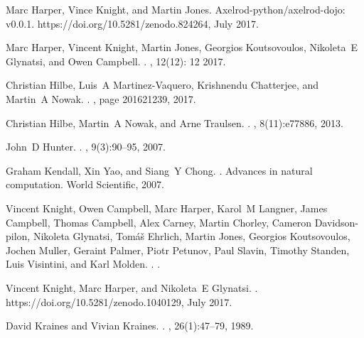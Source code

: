 \documentclass[10pt,letterpaper]{article}
\begin{document}
\begin{thebibliography}{10}
Marc Harper, Vince Knight, and Martin Jones.
\newblock Axelrod-python/axelrod-dojo: v0.0.1.
\newblock https://doi.org/10.5281/zenodo.824264, July 2017.

Marc Harper, Vincent Knight, Martin Jones, Georgios Koutsovoulos, Nikoleta~E
  Glynatsi, and Owen Campbell.
.
, 12(12): 12 2017.

Christian Hilbe, Luis~A Martinez-Vaquero, Krishnendu Chatterjee, and Martin~A
  Nowak.
.
, page
  201621239, 2017.

Christian Hilbe, Martin~A Nowak, and Arne Traulsen.
.
, 8(11):e77886, 2013.

John~D Hunter.
.
, 9(3):90--95, 2007.

Graham Kendall, Xin Yao, and Siang~Y Chong.
.
\newblock Advances in natural computation. World Scientific, 2007.

Vincent Knight, Owen Campbell, Marc Harper, Karol~M Langner, James Campbell,
  Thomas Campbell, Alex Carney, Martin Chorley, Cameron Davidson-pilon,
  Nikoleta Glynatsi, Tom{\'{a}}{\v{s}} Ehrlich, Martin Jones, Georgios
  Koutsovoulos, Jochen Muller, Geraint Palmer, Piotr Petunov, Paul Slavin,
  Timothy Standen, Luis Visintini, and Karl Molden.
.
.

Vincent Knight, Marc Harper, and Nikoleta~E Glynatsi.
.
\newblock https://doi.org/10.5281/zenodo.1040129, July 2017.

David Kraines and Vivian Kraines.
.
, 26(1):47--79, 1989.


\end{thebibliography}
\end{document}
